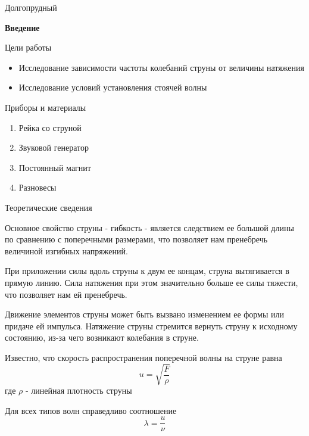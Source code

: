 \documentclass[12pt,a4paper]{article}
\begin{document}
\begin{center}
Долгопрудный 
\end{center}
\thispagestyle{empty}
\newpage
\begin{center}
\large{\bf Введение} 
\end{center}
\begin{center}
\large{Цели работы} \break
\end{center}
\begin{itemize}
\item Исследование зависимости частоты колебаний струны от величины натяжения
\item Исследование условий установления стоячей волны
\end{itemize}
\hfill \break
\begin{center}
\large{Приборы и материалы}
\end{center}
\begin{enumerate}
\item Рейка со струной
\item Звуковой генератор
\item Постоянный магнит
\item Разновесы
\end{enumerate}
\begin{center}
\large Теоретические сведения
\end{center}
\par Основное свойство струны - гибкость - является следствием ее большой длины по сравнению с поперечными размерами, что позволяет нам пренебречь величиной изгибных напряжений.
\par При приложении силы вдоль струны к двум ее концам, струна вытягивается в прямую линию. Сила натяжения при этом значительно больше ее силы тяжести, что позволяет нам ей пренебречь.
\par Движение элементов струны может быть вызвано изменением ее формы или придаче ей импульса. Натяжение струны стремится вернуть струну к исходному состоянию, из-за чего возникают колебания в струне.
\par Известно, что скорость распространения поперечной волны на струне равна 
\begin{equation}
u=\sqrt{\frac{F}{\rho}}
\end{equation} 
где $\rho$ - линейная плотность струны
\par Для всех типов волн справедливо соотношение 
\begin{equation}
\lambda=\frac{u}{\nu}
\end{equation}
\end{document}
